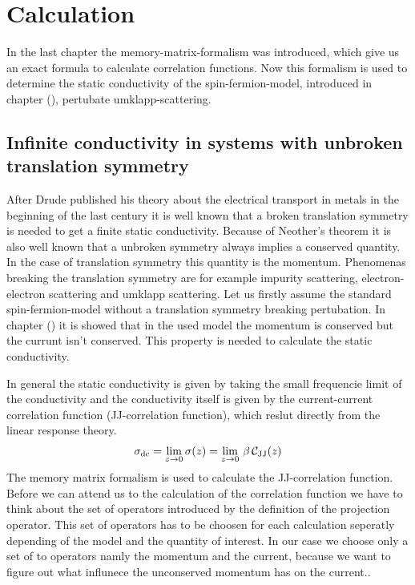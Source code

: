 \chapter{Calculation}
\label{ch: calculation}

In the last chapter the memory-matrix-formalism was introduced, which give us an exact formula to calculate correlation functions.
Now this formalism is used to determine the static conductivity of the spin-fermion-model, introduced in chapter (), pertubate umklapp-scattering.


\section{Infinite conductivity in systems with unbroken translation symmetry}
\label{sec: Infinite conductivity in a system with unbroken translation symmetry}
%
%
After Drude published his theory about the electrical transport in metals \cite{Drude} in the beginning of the last century it is well known that a broken translation symmetry is needed to get a finite static conductivity.
Because of Neother's theorem it is also well known that a unbroken symmetry always implies a conserved quantity.
In the case of translation symmetry this quantity is the momentum.
Phenomenas breaking the translation symmetry are for example impurity scattering, electron-electron scattering and umklapp scattering.
Let us firstly assume the standard spin-fermion-model without a translation symmetry breaking pertubation.
In chapter () it is showed that in the used model the momentum is conserved but the currunt isn't conserved.
This property is needed to calculate the static conductivity.

In general the static conductivity is given by taking the small frequencie limit of the conductivity and the conductivity itself is given by the current-current correlation function (JJ-correlation function), which reslut directly from the linear response theory.
%
\begin{align}
	\sigma_{\mathrm{dc}} = \lim\limits_{z \to 0} \sigma(z) = \lim\limits_{z \to 0}\, \beta\,\mathcal{C}_{\mathrm{JJ}}(z)
\end{align}
%
The memory matrix formalism is used to calculate the JJ-correlation function.
Before we can attend us to the calculation of the correlation function we have to think about the set of operators introduced by the definition of the projection operator.
This set of operators has to be choosen for each calculation seperatly depending of the model and the quantity of interest.
In our case we choose only a set of to operators namly the momentum and the current, because we want to figure out what influnece the unconserved momentum has on the current..


